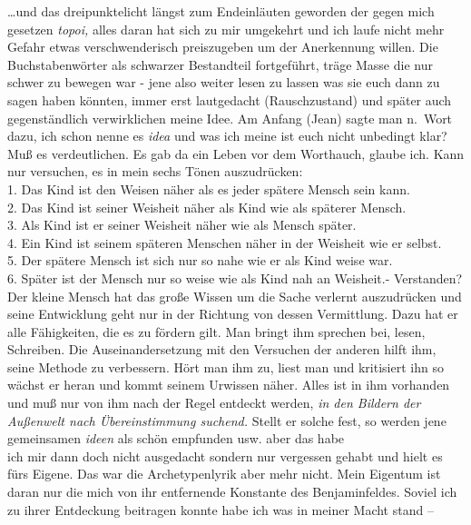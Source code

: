 \documentclass[
]{article}
\begin{document}
\ldots und das dreipunktelicht längst zum Endeinläuten geworden der
gegen mich gesetzen \emph{topoi,} alles daran hat sich zu mir umgekehrt
und ich laufe nicht mehr Gefahr etwas verschwenderisch preiszugeben um
der Anerkennung willen. Die Buchstabenwörter als schwarzer Bestandteil
fortgeführt, träge Masse die nur schwer zu bewegen war - jene also
weiter lesen zu lassen was sie euch dann zu sagen haben könnten, immer
erst lautgedacht (Rauschzustand) und später auch gegenständlich
verwirklichen meine Idee. Am Anfang (Jean) sagte man n.~Wort dazu, ich
schon nenne es \emph{idea} und was ich meine ist euch nicht unbedingt
klar? Muß es verdeutlichen. Es gab da ein Leben vor dem Worthauch,
glaube ich. Kann nur versuchen, es in mein sechs Tönen auszudrücken:\\
1. Das Kind ist den Weisen näher als es jeder spätere Mensch sein
kann.\\
2. Das Kind ist seiner Weisheit näher als Kind wie als späterer
Mensch.\\
3. Als Kind ist er seiner Weisheit näher wie als Mensch später.\\
4. Ein Kind ist seinem späteren Menschen näher in der Weisheit wie er
selbst.\\
5. Der spätere Mensch ist sich nur so nahe wie er als Kind weise war.\\
6. Später ist der Mensch nur so weise wie als Kind nah an Weisheit.-
Verstanden?\\
Der kleine Mensch hat das große Wissen um die Sache verlernt
auszudrücken und seine Entwicklung geht nur in der Richtung von dessen
Vermittlung. Dazu hat er alle Fähigkeiten, die es zu fördern gilt. Man
bringt ihm sprechen bei, lesen, Schreiben. Die Auseinandersetzung mit
den Versuchen der anderen hilft ihm, seine Methode zu verbessern. Hört
man ihm zu, liest man und kritisiert ihn so wächst er heran und kommt
seinem Urwissen näher. Alles ist in ihm vorhanden und muß nur von ihm
nach der Regel entdeckt werden, \emph{in den Bildern der Außenwelt nach
Übereinstimmung suchend.} Stellt er solche fest, so werden jene
gemeinsamen \emph{ideen} als schön empfunden usw. aber das habe\\
ich mir dann doch nicht ausgedacht sondern nur vergessen gehabt und
hielt es fürs Eigene. Das war die Archetypenlyrik aber mehr nicht. Mein
Eigentum ist daran nur die mich von ihr entfernende Konstante des
Benjaminfeldes. Soviel ich zu ihrer Entdeckung beitragen konnte habe ich
was in meiner Macht stand --
\end{document}
